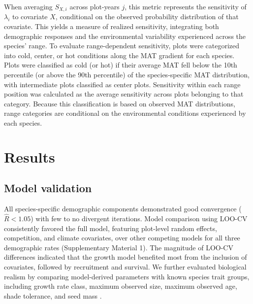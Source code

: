 When averaging \(S_{X,i}\) across plot-years \(j\), this metric
represents the sensitivity of \(\lambda_i\) to covariate \(X\),
conditional on the observed probability distribution of that covariate.
This yields a measure of realized sensitivity, integrating both
demographic responses and the environmental variability experienced
across the species' range. To evaluate range-dependent sensitivity,
plots were categorized into cold, center, or hot conditions along the
MAT gradient for each species. Plots were classified as cold (or hot) if
their average MAT fell below the 10th percentile (or above the 90th
percentile) of the species-specific MAT distribution, with intermediate
plots classified as center plots. Sensitivity within each range position
was calculated as the average sensitivity across plots belonging to that
category. Because this classification is based on observed MAT
distributions, range categories are conditional on the environmental
conditions experienced by each species.\\

\hypertarget{results}{%
\section{Results}\label{results}}

\hypertarget{model-validation}{%
\subsection{Model validation}\label{model-validation}}

All species-specific demographic components demonstrated good
convergence (\(\hat{R} < 1.05\)) with few to no divergent iterations.
Model comparison using LOO-CV consistently favored the full model,
featuring plot-level random effects, competition, and climate
covariates, over other competing models for all three demographic rates
(Supplementary Material 1). The magnitude of LOO-CV differences
indicated that the growth model benefited most from the inclusion of
covariates, followed by recruitment and survival. We further evaluated
biological realism by comparing model-derived parameters with known
species trait groups, including growth rate class, maximum observed
size, maximum observed age, shade tolerance, and seed mass
\citep{burns1990silvics, diaz2022}.\\

